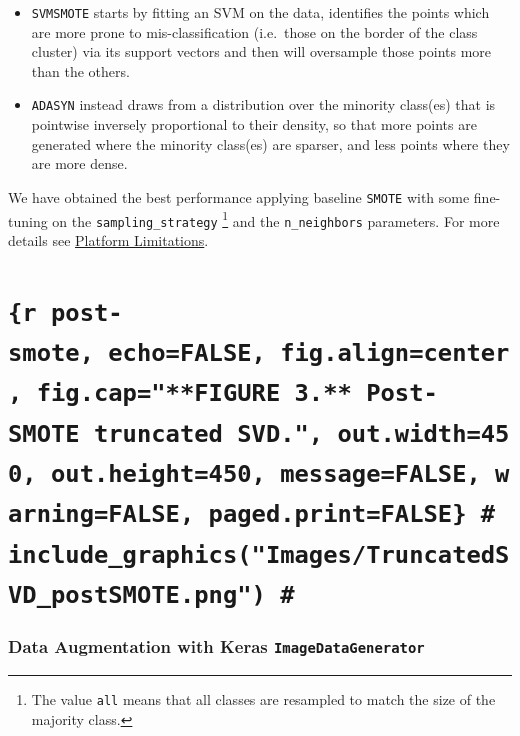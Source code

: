 \documentclass[10pt,]{article}
\providecommand{\tightlist}{%
  \setlength{\itemsep}{0pt}\setlength{\parskip}{0pt}}
\begin{document}
\begin{itemize}
\tightlist
\item
  \texttt{SVMSMOTE} starts by fitting an SVM on the data, identifies the
  points which are more prone to mis-classification (i.e.~those on the
  border of the class cluster) via its support vectors and then will
  oversample those points more than the others.
\item
  \texttt{ADASYN} instead draws from a distribution over the minority
  class(es) that is pointwise inversely proportional to their density,
  so that more points are generated where the minority class(es) are
  sparser, and less points where they are more dense.
\end{itemize}

We have obtained the best performance applying baseline \texttt{SMOTE}
with some fine-tuning on the \texttt{sampling\_strategy} \footnote{The
  value \texttt{all} means that all classes are resampled to match the
  size of the majority class.} and the \texttt{n\_neighbors} parameters.
For more details see \protect\hyperlink{platform-limitations}{Platform
Limitations}.

\hypertarget{r-post-smote-echofalse-fig.aligncenter-fig.capfigure-3.-post-smote-truncated-svd.-out.width450-out.height450-messagefalse-warningfalse-paged.printfalse-include_graphicsimagestruncatedsvd_postsmote.png}{%
\section{\texorpdfstring{\texttt{\{r\ post-smote,\ echo=FALSE,\ fig.align=\textquotesingle{}center\textquotesingle{},\ fig.cap="**FIGURE\ 3.**\ Post-\textasciigrave{}SMOTE\textasciigrave{}\ truncated\ SVD.",\ out.width=450,\ out.height=450,\ message=FALSE,\ warning=FALSE,\ paged.print=FALSE\}\ \#\ include\_graphics("Images/TruncatedSVD\_postSMOTE.png")\ \#}}{\{r post-smote, echo=FALSE, fig.align='center', fig.cap="**FIGURE 3.** Post-`SMOTE` truncated SVD.", out.width=450, out.height=450, message=FALSE, warning=FALSE, paged.print=FALSE\} \# include\_graphics("Images/TruncatedSVD\_postSMOTE.png") \#}}\label{r-post-smote-echofalse-fig.aligncenter-fig.capfigure-3.-post-smote-truncated-svd.-out.width450-out.height450-messagefalse-warningfalse-paged.printfalse-include_graphicsimagestruncatedsvd_postsmote.png}}

\hypertarget{data-generator}{%
\subsubsection{\texorpdfstring{Data Augmentation with Keras
\texttt{ImageDataGenerator}}{Data Augmentation with Keras ImageDataGenerator}}\label{data-generator}}
\end{document}
